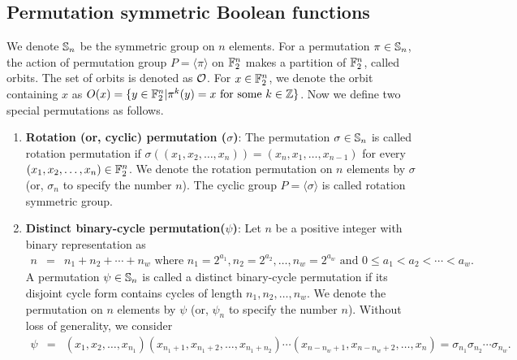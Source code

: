\documentclass{llncs}
\begin{document}
\subsection{Permutation symmetric Boolean functions}\label{ssec:PSBF}
We denote $\mathbb{S}_n$ be the symmetric group on $n$ elements. For a permutation $\pi\in \mathbb{S}_n$, the action of permutation group $P = \langle \pi \rangle$ on $\mathbb{F}_2^n$ makes a partition of $\mathbb{F}_2^n$, called orbits. The set of orbits is denoted as $\mathcal{O}$. For $x \in \mathbb{F}_2^n$, we denote the orbit containing $x$ as
$O(x) = \{y \in \mathbb{F}_2^n | \pi^k(y) = x \text{ for some } k \in \mathbb{Z}\}$. Now we define two special permutations as follows.
\begin{enumerate}
\item {\bf Rotation (or, cyclic) permutation ($\sigma$)}: The permutation $\sigma \in \mathbb{S}_n$ is called rotation permutation if $\sigma((x_1,x_2,\ldots,x_n)) = (x_n,x_1,\ldots,x_{n-1})$  for every $(x_1,x_2,\ldots,x_n) \in \mathbb{F}_2^n$. We denote the rotation permutation on $n$ elements by $\sigma$ (or, $\sigma_n$ to specify the number $n$).
The cyclic group $P = \langle \sigma \rangle$ is called rotation symmetric group.

\item {\bf Distinct binary-cycle permutation($\psi$)}: 
Let $n$ be a positive integer with binary representation as
\begin{eqnarray}\label{eqn:binn}
n & = & n_1 + n_2 + \cdots + n_w \text{ where } n_1 = 2^{a_1}, n_2 = 2^{a_2}, \ldots, n_w = 2^{a_w} \text{ and } 0 \leq a_1 < a_2 < \cdots < a_w.
\end{eqnarray}
A permutation $\psi \in \mathbb{S}_n$ is called a distinct binary-cycle permutation if its disjoint cycle form contains cycles of length $n_1, n_2,  \ldots, n_w$. We denote the permutation on $n$ elements by $\psi$ (or, $\psi_n$ to specify the number $n$).
Without loss of generality, we consider 
\begin{eqnarray}\label{eqn:cycperm}
\psi & = & (x_1, x_2, \ldots, x_{n_1}) (x_{n_1+1}, x_{n_1+2}, \ldots, x_{n_1+n_2})\cdots (x_{n-n_w+1}, x_{n-n_w+2}, \ldots, x_n) = \sigma_{n_1}\sigma_{n_2} \cdots\sigma_{n_w}.
\end{eqnarray}
\end{enumerate}
\end{document}
